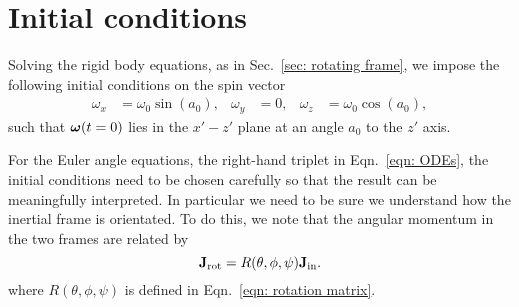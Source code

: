 \documentclass[../full_thesis/full_thesis.tex]{subfiles}
\begin{document}
\section{Initial conditions}

Solving the rigid body equations, as in Sec.~\ref{sec:
rotating frame}, we impose the following initial conditions on the
spin vector
\begin{align}\label{eqn: spin init}
\omega_{x} & = \omega_{0}\sin(a_{0}), &
\omega_{y} & = 0, &
\omega_{z} & = \omega_{0}\cos(a_{0}),
\end{align}
such that $\boldsymbol{\omega}(t=0)$ lies in the $x' - z'$ plane at an angle $a_{0}$ to the
$z'$ axis.

For the Euler angle equations, the right-hand triplet in Eqn.~\eqref{eqn:
ODEs}, the initial conditions need to be chosen carefully so that the result
can be meaningfully interpreted. In particular we need to be sure we understand
how the inertial frame is orientated. To do this, we note that the angular
momentum in the two frames are related by
\begin{equation}
\mathbf{J}_{\textrm{rot}} = R(\theta, \phi, \psi) \mathbf{J}_{\textrm{in}} .
\label{eqn: transform}
\end{equation}
where $R(\theta, \phi, \psi)$ is defined in Eqn.~\eqref{eqn: rotation matrix}.
\end{document}
